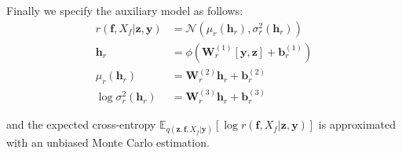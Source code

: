 \documentclass[12pt]{article}
\newcommand{\zb}{\mathbf{z}}
\newcommand{\fb}{\mathbf{f}}
\newcommand{\yb}{\mathbf{y}}
\newcommand{\Ex}{\mathbb{E}}
\newcommand{\No}{\mathcal{N}}
\newcommand{\Wb}{\mathbf{W}}
\newcommand{\hb}{\mathbf{h}}
\newcommand{\bb}{\mathbf{b}}
\begin{document}
%
Finally we specify the auxiliary model as follows:
%
\begin{align}
    r(\fb,X_f|\zb,\yb) &= \No(\mu_r(\hb_r), \sigma_r^2(\hb_r)) \\
    \hb_r &= \phi(\Wb^{(1)}_r [\yb,\zb] + \bb^{(1)}_r) \\
    \mu_r(\hb_r)&=\Wb^{(2)}_r \hb_r + \bb^{(2)}_r \\
    \log\sigma^2_r(\hb_r)&=\Wb^{(3)}_r \hb_r + \bb^{(3)}_r
\end{align}

and the expected cross-entropy $\Ex_{q(\zb,\fb,X_f|\yb)}\left[ \log r(\fb,X_f|\zb,\yb) \right]$ is approximated with an unbiased Monte Carlo estimation.
\end{document}
